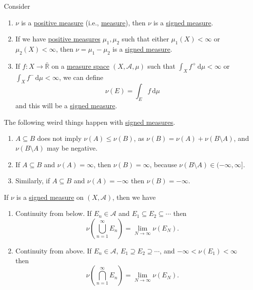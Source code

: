 \begin{eg}
  Consider
  \begin{enumerate}
    \item \(\nu\) is a \hyperref[def:measure]{positive measure} (i.e., \hyperref[def:measure]{measure}), then \(\nu\) is a \hyperref[def:signed-measure]{signed measure}.
    \item If we have \hyperref[def:measure]{positive measures} \(\mu_1,\mu_2\) such that either \(\mu_1(X) < \infty\) or \(\mu_2(X) < \infty\), then \(\nu = \mu_1 - \mu_2\) is a \hyperref[def:signed-measure]{signed measure}.
    \item If \(f \colon X \to \bar{\mathbb{R}}\) on a \hyperref[def:measure-space]{measure space} \((X,\mathcal{A},\mu)\) such that \(\int_X f^+ \,\mathrm{d} \mu < \infty\) or \(\int_X f^- \,\mathrm{d} \mu < \infty\), we can define
          \[
            \nu(E) = \int_E f \,\mathrm{d} \mu
          \]
          and this will be a \hyperref[def:signed-measure]{signed measure}.
  \end{enumerate}
\end{eg}

\begin{note}
  The following weird things happen with \hyperref[def:signed-measure]{signed measures}.
  \begin{enumerate}
    \item \(A \subseteq B\) does not imply \(\nu(A) \leq \nu(B)\), as \(\nu(B) = \nu(A) + \nu(B \setminus A)\), and \(\nu(B \setminus A)\) may be negative.
    \item If \(A \subseteq B\) and \(\nu(A) = \infty\), then \(\nu(B) = \infty\), because \(\nu(B \setminus A) \in (-\infty,\infty]\).
    \item Similarly, if \(A \subseteq B\) and \(\nu(A) = -\infty\) then \(\nu(B) = -\infty\).
  \end{enumerate}
\end{note}

\begin{lemma}\label{lemma:signed-cont-above-below}
  If \(\nu\) is a \hyperref[def:signed-measure]{signed measure} on \((X, \mathcal{A})\), then we have
  \begin{enumerate}
    \item\label{lma:signed-continuity-from-below} Continuity from below. If \(E_n \in \mathcal{A}\) and \(E_1 \subseteq E_2 \subseteq \cdots\) then
    \[
      \nu\left( \bigcup_{n=1}^\infty E_n \right)  = \lim_{N \to \infty} \nu(E_N).
    \]
    \item\label{lma:signed-continuity-from-above} Continuity from above. If \(E_n \in \mathcal{A}\), \(E_1 \supseteq E_2 \supseteq \cdots\),
    and \(-\infty < \nu(E_1) < \infty\) then
    \[
      \nu\left( \bigcap_{n=1}^\infty E_n \right)  = \lim_{N \to \infty} \nu(E_N).
    \]
  \end{enumerate}
\end{lemma}

